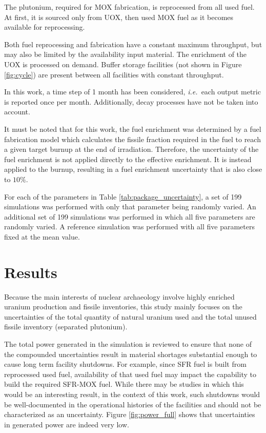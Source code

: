 \documentclass{anstrans}
\newcommand{\ie}{\emph{i.e.\ }}
\begin{document}
The plutonium, required for \gls{MOX} fabrication, is reprocessed from all used
fuel.  At first, it is sourced only from \gls{UOX}, then used \gls{MOX} fuel as
it becomes available for reprocessing.

Both fuel reprocessing and fabrication have a constant maximum throughput, but
may also be limited by the availability input material.  The enrichment of the
\gls{UOX} is processed on demand.  Buffer storage facilities (not shown in
Figure \ref{fig:cycle}) are present between all facilities with constant
throughput.

In this work, a time step of 1 month has been considered, \ie each output metric
is reported once per month. Additionally, decay processes have not be taken into
account.  

It must be noted that for this work, the fuel enrichment was determined by a
fuel fabrication model\cite{Leniau2015125} which calculates the fissile fraction
required in the fuel to reach a given target burnup at the end of irradiation.
Therefore, the uncertainty of the fuel enrichment is not applied directly to the
effective enrichment. It is instead applied to the burnup, resulting in a fuel
enrichment uncertainty that is also close to $10\%$.

For each of the parameters in Table \ref{tab:package_uncertainty}, a set of 199
simulations was performed with only that parameter being randomly varied.  An
additional set of 199 simulations was performed in which all five parameters are
randomly varied.  A reference simulation was performed with all five parameters
fixed at the mean value.


\section{Results}

Because the main interests of nuclear archaeology involve highly enriched
uranium production and fissile inventories, this study mainly focuses on the
uncertainties of the total quantity of natural uranium used and the total unused
fissile inventory (separated plutonium).

The total power generated in the simulation is reviewed to ensure that none of
the compounded uncertainties result in material shortages substantial enough to
cause long term facility shutdowns.  For example, since \gls{SFR} fuel is built
from reprocessed used fuel, availability of that used fuel may impact the
capability to build the required \gls{SFR}-\gls{MOX} fuel.  While there may be
studies in which this would be an interesting result, in the context of this
work, such shutdowns would be well-documented in the operational histories of
the facilities and should not be characterized as an uncertainty.  Figure
\ref{fig:power_full} shows that uncertainties in generated power are indeed very
low.
\end{document}
